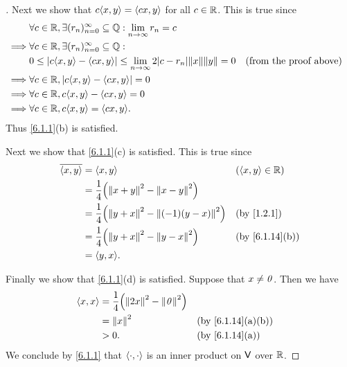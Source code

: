 \begin{proof}[]
  Next we show that \(c \inn{x, y} = \inn{cx, y}\) for all \(c \in \mathbb{R}\).
  This is true since
  \begin{align*}
             & \forall c \in \R, \exists (r_n)_{n = 0}^\infty \subseteq \Q : \Lim_{n \to \infty} r_n = c                                                 \\
    \implies & \forall c \in \R, \exists (r_n)_{n = 0}^\infty \subseteq \Q :                                                                             \\
             & 0 \leq \abs{c \inn{x, y} - \inn{cx, y}} \leq \Lim_{n \to \infty} 2 \abs{c - r_n} \norm{x} \norm{y} = 0 &  & \text{(from the proof above)} \\
    \implies & \forall c \in \R, \abs{c \inn{x, y} - \inn{cx, y}} = 0                                                                                    \\
    \implies & \forall c \in \R, c \inn{x, y} - \inn{cx, y} = 0                                                                                          \\
    \implies & \forall c \in \R, c \inn{x, y} = \inn{cx, y}.
  \end{align*}
  Thus \cref{6.1.1}(b) is satisfied.

  Next we show that \cref{6.1.1}(c) is satisfied.
  This is true since
  \begin{align*}
    \conj{\inn{x, y}} & = \inn{x, y}                                              &  & (\inn{x, y} \in \R) \\
                      & = \frac{1}{4} \pa{\norm{x + y}^2 - \norm{x - y}^2}                                 \\
                      & = \frac{1}{4} \pa{\norm{y + x}^2 - \norm{(-1) (y - x)}^2} &  & \by{1.2.1}          \\
                      & = \frac{1}{4} \pa{\norm{y + x}^2 - \norm{y - x}^2}        &  & \by{6.1.14}[b]      \\
                      & = \inn{y, x}.
  \end{align*}

  Finally we show that \cref{6.1.1}(d) is satisfied.
  Suppose that \(x \neq \mathit{0}\).
  Then we have
  \begin{align*}
    \inn{x, x} & = \frac{1}{4} \pa{\norm{2x}^2 - \norm{\zv}^2}                       \\
               & = \norm{x}^2                                  &  & \by{6.1.14}[a,b] \\
               & > 0.                                          &  & \by{6.1.14}[a]
  \end{align*}
  We conclude by \cref{6.1.1} that \(\left\langle\cdot, \cdot\right\rangle\) is an inner product on \(\mathsf{V}\) over \(\mathbb{R}\).
\end{proof}

